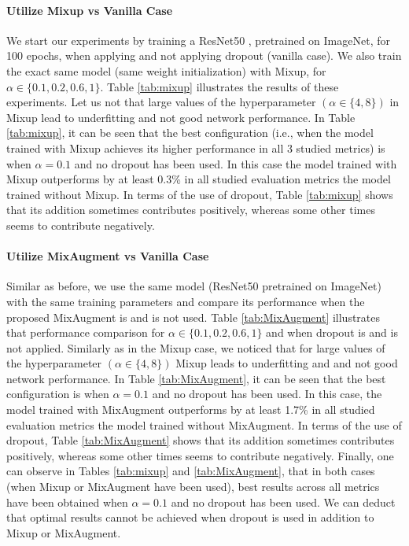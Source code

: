 \documentclass[10pt,twocolumn,letterpaper]{article}
\begin{document}
\paragraph{Utilize Mixup vs Vanilla Case} We start our experiments by training a ResNet50 \cite{he2016deep}, pretrained on ImageNet, for 100 epochs, when applying and not applying dropout (vanilla case). We also train the exact same model (same weight initialization) with Mixup, for $\alpha \in \{0.1, 0.2, 0.6, 1\}$. Table \ref{tab:mixup} illustrates the results of these experiments. Let us not that  large values of the hyperparameter $(\alpha \in \{4,8\})$ in Mixup lead to underfitting and not good network performance. In Table \ref{tab:mixup}, it can be seen that the best configuration (i.e., when the model trained with Mixup achieves its higher performance in all 3 studied metrics) is  when $\alpha=0.1$ and no dropout has been used. In this case the model trained with Mixup outperforms by at least 0.3\% in all studied evaluation metrics the model trained without Mixup. In terms of the use of dropout, Table \ref{tab:mixup} shows that its addition sometimes contributes positively, whereas some other times seems to contribute negatively. 


\paragraph{Utilize MixAugment vs Vanilla Case} Similar as before, we use the same model (ResNet50 pretrained on ImageNet) with the same training parameters and compare its performance when the proposed MixAugment is and is not used. Table \ref{tab:MixAugment} illustrates that performance comparison for $\alpha \in \{0.1, 0.2, 0.6, 1\}$ and when dropout is and is not applied. Similarly as in the Mixup case, we noticed that for large values of the hyperparameter $(\alpha \in \{4,8\})$ Mixup leads to underfitting and and not good network performance. In Table \ref{tab:MixAugment}, it can be seen that the best configuration is when $\alpha=0.1$ and no dropout has been used. In this case, the model trained with MixAugment outperforms by at least 1.7\% in all studied evaluation metrics the model trained without MixAugment. In terms of the use of dropout, Table \ref{tab:MixAugment} shows that its addition sometimes contributes positively, whereas some other times seems to contribute negatively. 
Finally, one can observe in Tables  \ref{tab:mixup}  and  \ref{tab:MixAugment}, that in both cases (when Mixup or MixAugment have been used), best results across all metrics have been obtained when $\alpha=0.1$ and no dropout has been used. We can deduct that optimal results cannot be achieved when dropout is used in addition to Mixup or MixAugment. 
\end{document}
